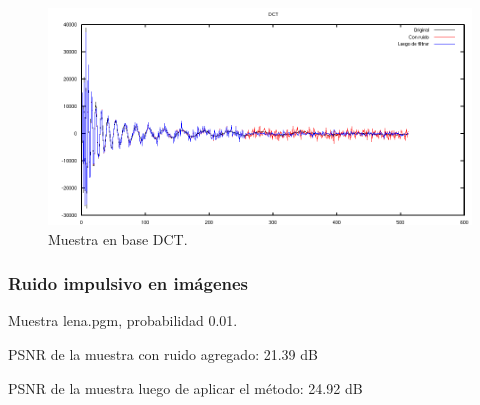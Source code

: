 \documentclass[a4paper,10pt,twoside]{article}
\begin{document}
\begin{figure}[H]
  \centering
  \includegraphics[width=15cm]{graficos/dopp_impulsivo_umbralizar_dct.png} 
  \caption{Muestra en base DCT.}
\end{figure}


\subsubsection{Ruido impulsivo en imágenes}

Muestra lena.pgm, probabilidad 0.01.

PSNR de la muestra con ruido agregado: 21.39 dB

PSNR de la muestra luego de aplicar el método: 24.92 dB
\end{document}
